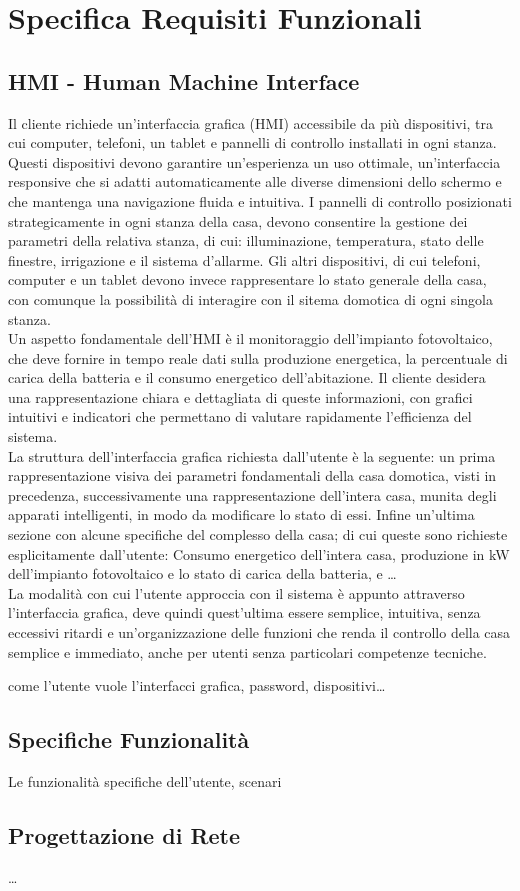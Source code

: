 \documentclass[italian, 12pt, a4paper]{article}
\begin{document}
\clearpage
\section{Specifica Requisiti Funzionali}\label{sec:requisiti2}
\subsection{HMI - Human Machine Interface}
Il cliente richiede un’interfaccia grafica (HMI) accessibile da più dispositivi, tra cui computer, telefoni, un tablet e pannelli di controllo installati in ogni stanza. Questi dispositivi devono garantire un'esperienza un uso ottimale, un'interfaccia responsive che si adatti automaticamente alle diverse dimensioni dello schermo e che mantenga una navigazione fluida e intuitiva.  I pannelli di controllo posizionati strategicamente in ogni stanza della casa, devono consentire la gestione dei parametri della relativa stanza, di cui: illuminazione, temperatura, stato delle finestre, irrigazione e il sistema d’allarme. Gli altri dispositivi, di cui telefoni, computer e un tablet devono invece rappresentare lo stato generale della casa, con comunque la possibilità di interagire con il sitema domotica di ogni singola stanza.\\[1.5mm]
Un aspetto fondamentale dell’HMI è il monitoraggio dell’impianto fotovoltaico, che deve fornire in tempo reale dati sulla produzione energetica, la percentuale di carica della batteria e il consumo energetico dell’abitazione. Il cliente desidera una rappresentazione chiara e dettagliata di queste informazioni, con grafici intuitivi e indicatori che permettano di valutare rapidamente l’efficienza del sistema.\\[1.5mm]
La struttura dell’interfaccia grafica richiesta dall’utente è la seguente: un prima rappresentazione visiva dei parametri fondamentali della casa domotica, visti in precedenza, successivamente una rappresentazione dell’intera casa, munita degli apparati intelligenti, in modo da modificare lo stato di essi. Infine un’ultima sezione con alcune specifiche del complesso della casa; di cui queste sono richieste esplicitamente dall’utente: Consumo energetico dell’intera casa, produzione in kW dell’impianto fotovoltaico e lo stato di carica della batteria, e \ldots\\[1.5mm]
La modalità con cui l’utente approccia con il sistema è appunto attraverso l’interfaccia grafica, deve quindi quest’ultima essere semplice, intuitiva, senza eccessivi ritardi e un’organizzazione delle funzioni che renda il controllo della casa semplice e immediato, anche per utenti senza particolari competenze tecniche.

come l'utente vuole l'interfacci grafica, password, dispositivi\ldots
\subsection{Specifiche Funzionalità}
Le funzionalità specifiche dell'utente, scenari
\subsection{Progettazione di Rete}
\ldots
\clearpage
\end{document}
